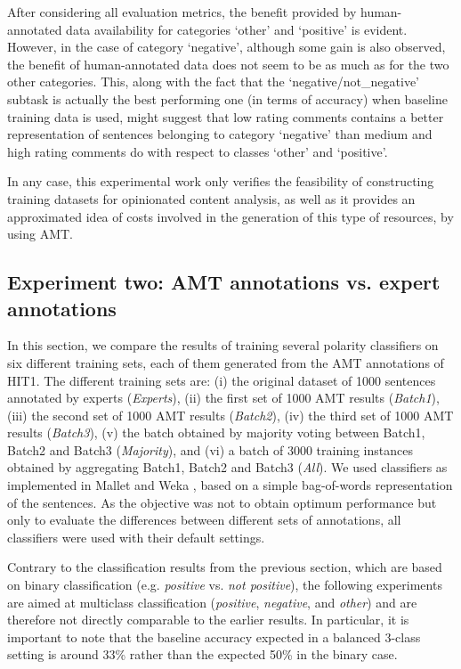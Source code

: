 \documentclass[11pt, a4paper,onecolumn]{article}
\begin{document}
After considering all evaluation metrics, the benefit provided by human-annotated data 
availability for categories `other' and `positive' is evident. However, in the case of category `negative', although some 
gain is also observed, the benefit of human-annotated data does not seem to be as much as for the two other 
categories. This, along with the fact that the `negative/not\_negative' subtask is actually the best performing
one (in terms of accuracy) when baseline training data is used, might suggest that low rating comments contains 
a better representation of sentences belonging to category `negative' than medium and high rating comments do with
respect to classes `other' and `positive'. 

In any case, this experimental work only verifies the feasibility of constructing training datasets for
opinionated content analysis, as well as it provides an approximated idea of costs involved in the generation
of this type of resources, by using AMT.


\subsection{Experiment two: AMT annotations vs. expert annotations}
\label{sect:eval2}

In this section, we compare the results of training several polarity classifiers on six different training sets, each of them generated from the AMT annotations of HIT1. The different training sets are: (i) the original dataset of 1000 sentences annotated by experts (\textit{Experts}), (ii) the first set of 1000 AMT results (\textit{Batch1}), (iii) the second set of 1000 AMT results (\textit{Batch2}), (iv) the third set of 1000 AMT results (\textit{Batch3}), (v) the batch obtained by majority voting between Batch1, Batch2 and Batch3 (\textit{Majority}), and (vi) a batch of 3000 training instances obtained by aggregating Batch1, Batch2 and Batch3 (\textit{All}).  We used classifiers as implemented in Mallet \cite{mccallum} and Weka \cite{weka}, based on a simple bag-of-words representation of the sentences.  As the objective was not to obtain optimum performance but only to evaluate the differences between different sets of annotations, all classifiers were used with their default settings.

Contrary to the classification results from the previous section, which are based on binary classification (e.g. \emph{positive} vs. \emph{not positive}), the following experiments are aimed at multiclass classification (\emph{positive}, \emph{negative}, and \emph{other}) and are therefore not directly comparable to the earlier results.  In particular, it is important to note that the baseline accuracy expected in a balanced 3-class setting is around 33\% rather than the expected 50\% in the binary case.
\end{document}
